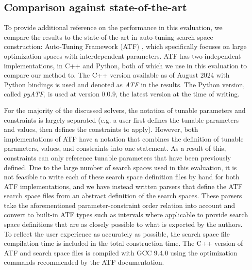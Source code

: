 
\subsection{Comparison against state-of-the-art} \label{subsec:evaluation_compared_frameworks}
To provide additional reference on the performance in this evaluation, we compare the results to the state-of-the-art in auto-tuning search space construction: Auto-Tuning Framework (ATF) \cite{raschATFGenericAutoTuning2017}, which specifically focuses on large optimization spaces with interdependent parameters. 
ATF has two independent implementations, in C++ and Python, both of which we use in this evaluation to compare our method to. The C++ version available as of August 2024 with Python bindings is used and denoted as \textit{ATF} in the results. The Python version, called \textit{pyATF}, is used at version 0.0.9, the latest version at the time of writing.

For the majority of the discussed solvers, the notation of tunable parameters and constraints is largely separated (e.g. a user first defines the tunable parameters and values, then defines the constraints to apply). However, both implementations of ATF have a notation that combines the definition of tunable parameters, values, and constraints into one statement. As a result of this, constraints can only reference tunable parameters that have been previously defined. Due to the large number of search spaces used in this evaluation, it is not feasible to write each of these search space definition files by hand for both ATF implementations, and we have instead written parsers that define the ATF search space files from an abstract definition of the search spaces. These parsers take the aforementioned parameter-constraint order relation into account and convert to built-in ATF types such as intervals where applicable to provide search space definitions that are as closely possible to what is expected by the authors. 
To reflect the user experience as accurately as possible, the search space file compilation time is included in the total construction time. 
The C++ version of ATF and search space files is compiled with GCC 9.4.0 using the optimization commands recommended by the ATF documentation. 


